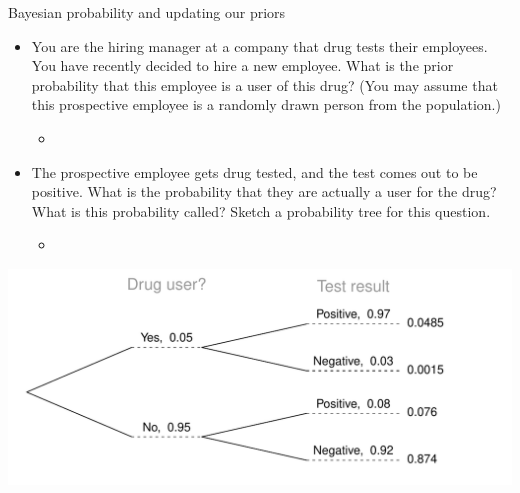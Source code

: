 \documentclass[slidestop,compress,mathserif,11pt,t,professionalfonts,xcolor=table]{beamer}
\begin{document}
\begin{frame}{Bayesian probability and updating our priors}
\pause
\begin{itemize}


\item You are the hiring manager at a company that drug tests their employees. You have recently decided to hire a new employee. What is the prior probability that this employee is a user of this drug? (You may assume that this prospective employee is a randomly drawn person from the population.)\pause

	\begin{itemize} 
	\item {}
	\end{itemize}
\end{itemize}
\end{frame}


\begin{frame}
\begin{itemize}
\item The prospective employee gets drug tested, and the test comes out to be positive. What is the probability that they are actually a user for the drug? What is this probability called? Sketch a probability tree for this question. \pause

	\begin{itemize}
	\item {} \pause
	\end{itemize}
\end{itemize}

\includegraphics[width = \textwidth]{figures/test1.pdf}

\end{frame}
\end{document}
